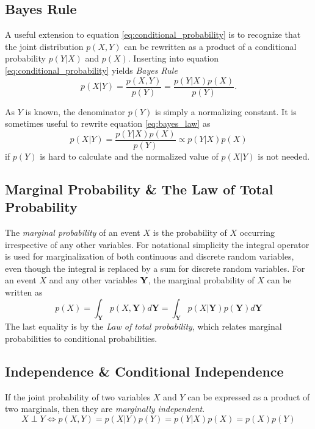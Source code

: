 \subsection{Bayes Rule}

A useful extension to equation \eqref{eq:conditional_probability} is to recognize that the joint distribution $p(X, Y)$ can be rewritten as a product of a conditional probability $p(Y | X)$ and $p(X)$. Inserting into equation \eqref{eq:conditional_probability} yields \textit{Bayes Rule}
\begin{equation}\label{eq:bayes_law}
    p(X | Y) = \frac{p(X, Y)}{p(Y)} = \frac{p(Y | X)p(X)}{p(Y)}.
\end{equation}

As $Y$ is known, the denominator $p(Y)$ is simply a normalizing constant. It is sometimes useful to rewrite equation \eqref{eq:bayes_law} as
\begin{equation}\label{eq:bayes_law_proportional}
    p(X | Y) = \frac{p(Y | X) p(X)}{p(Y)} \propto p(Y | X)p(X)
\end{equation} 
if $p(Y)$ is hard to calculate and the normalized value of $p(X | Y)$ is not needed.

\subsection{Marginal Probability \& The Law of Total Probability}\label{sec:marginal_prob}
The \textit{marginal probability} of an event $X$ is the probability of $X$ occurring irrespective of any other variables.
For notational simplicity the integral operator is used for marginalization of both continuous and discrete random variables, even though the integral is replaced by a sum for discrete random variables. For an event $X$ and any other variables $\bf Y$, the marginal probability of $X$ can be written as
\begin{equation}
    p(X) = \int_{\boldsymbol{Y}} p(X, \boldsymbol{Y}) d\boldsymbol{Y} = \int_{\boldsymbol{Y}} p(X | \boldsymbol{Y}) p(\boldsymbol{Y}) d\boldsymbol{Y}
\end{equation}
The last equality is by the \textit{Law of total probability}, which relates marginal probabilities to conditional probabilities.

\subsection{Independence \& Conditional Independence}
If the joint probability of two variables $X$ and $Y$ can be expressed as a product of two marginals, then they are \textit{marginally independent}.
\begin{equation}
    X \perp Y \iff p(X, Y) = p(X | Y)p(Y) = p(Y | X)p(X) = p(X)p(Y)
\end{equation}

